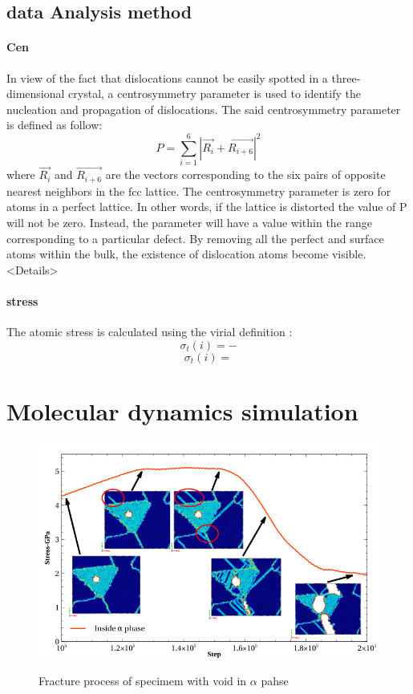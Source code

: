 \documentclass[final,5p,times,twocolumn]{elsarticle}
\begin{document}
\subsection{data Analysis method}
\paragraph{Cen}
In view of the fact that dislocations cannot be easily spotted in a three-dimensional crystal, a centrosymmetry parameter \cite{C.L. Kelchner1998} is used to identify the nucleation and propagation of dislocations. The said centrosymmetry parameter is defined as follow:
$$P = \displaystyle\sum_{i=1}^{6}|\vec{R_i}+\vec{R_{i+6}}|^2$$
where $\vec{R_i}$ and $\vec{R_{i+6}}$ are the vectors corresponding to the six pairs of opposite nearest neighbors in the fcc lattice. The centrosymmetry parameter is zero for atoms in a perfect lattice. In other words, if the lattice is distorted the value of P will not be zero. Instead, the parameter will have a value within the range corresponding to a particular defect. By removing all the perfect and surface atoms within the bulk, the existence of dislocation atoms become visible.<Details>
\paragraph{stress}
The atomic stress is calculated using the virial definition :
$$\sigma_t(i)=-$$
$$\sigma_t(i)= $$
\section{Molecular dynamics simulation}


\begin{figure}
	\centering
	\includegraphics[width=1\linewidth]{img/process-ia}
	\label{fig:process.ia}
	\caption{Fracture process of specimem with void in $\alpha$ pahse}
\end{figure}
\end{document}
